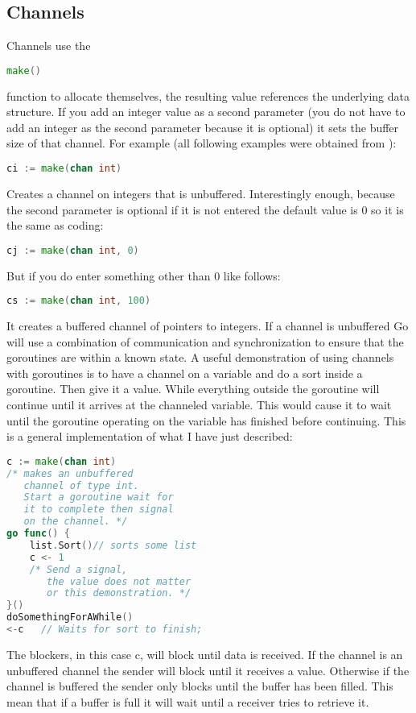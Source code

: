 \subsection{Channels}
Channels use the
\begin{lstlisting}[language=Go] 
make()
\end{lstlisting} 
function to allocate themselves, the resulting value references the underlying data structure. If you add an integer value as a second parameter (you do not have to add an integer as the second parameter because it is optional) it sets the buffer size of that channel. For example (all following examples were obtained from \cite{website:go-lang-documentation}): 
\begin{lstlisting}[language=Go]
ci := make(chan int)
\end{lstlisting}
Creates a channel on integers that is unbuffered. Interestingly enough, because the second parameter is optional if it is not entered the default value is 0 so it is the same as coding:
\begin{lstlisting}[language=Go]
cj := make(chan int, 0)
\end{lstlisting}
But if you do enter something other than 0 like follows:
\begin{lstlisting}[language=Go]
cs := make(chan int, 100) 
\end{lstlisting}
It creates a buffered channel of pointers to integers. 
If a channel is unbuffered Go will use a combination of communication and synchronization to ensure that the goroutines are within a known state.  A useful demonstration of using channels with goroutines is to have a channel on a variable and do a sort inside a goroutine. Then give it a value. While everything outside the goroutine will continue until it arrives at the channeled variable. This would cause it to wait until the goroutine operating on the variable has finished before continuing.  This is a general implementation of what I have just described:
\begin{lstlisting}[language=Go]
c := make(chan int)  
/* makes an unbuffered 
   channel of type int.
   Start a goroutine wait for
   it to complete then signal 
   on the channel. */
go func() {
    list.Sort()// sorts some list 
    c <- 1  
    /* Send a signal, 
       the value does not matter 
       or this demonstration. */
}()
doSomethingForAWhile()
<-c   // Waits for sort to finish; 
\end{lstlisting}
The blockers, in this case c, will block until data is received. If the channel is an unbuffered channel the sender will block until it receives a value. Otherwise if the channel is buffered the sender only blocks until the buffer has been filled. This mean that if a buffer is full it will wait until a receiver tries to retrieve it. 
